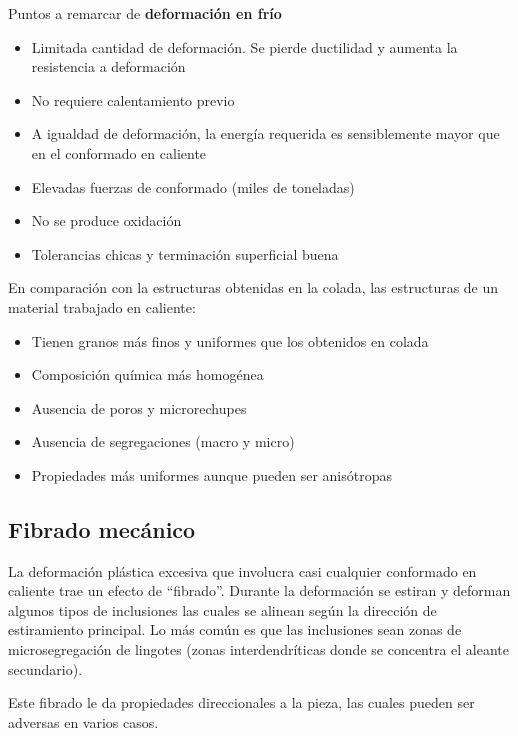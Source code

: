 Puntos a remarcar de \textbf{deformación en frío}
\begin{itemize}
	\item Limitada cantidad de deformación. Se pierde ductilidad y aumenta la resistencia a deformación
	\item No requiere calentamiento previo
	\item A igualdad de deformación, la energía requerida es sensiblemente mayor que en el conformado en caliente
	\item Elevadas fuerzas de conformado (miles de toneladas)
	\item No se produce oxidación
	\item Tolerancias chicas y terminación superficial buena
\end{itemize}


En comparación con la estructuras obtenidas en la colada, las estructuras de un material trabajado en caliente:
\begin{itemize}
	\item Tienen granos más finos y uniformes que los obtenidos en colada
	\item Composición química más homogénea
	\item Ausencia de poros y microrechupes
	\item Ausencia de segregaciones (macro y micro)
	\item Propiedades más uniformes aunque pueden ser anisótropas
\end{itemize}

\subsection{Fibrado mecánico}

La deformación plástica excesiva que involucra casi cualquier conformado en caliente trae un efecto de ``fibrado''. Durante la deformación se estiran y deforman algunos tipos de inclusiones las cuales se alinean según la dirección de estiramiento principal. Lo más común es que las inclusiones sean zonas de microsegregación de lingotes (zonas interdendríticas donde se concentra el aleante secundario).

Este fibrado le da propiedades direccionales a la pieza, las cuales pueden ser adversas en varios casos.